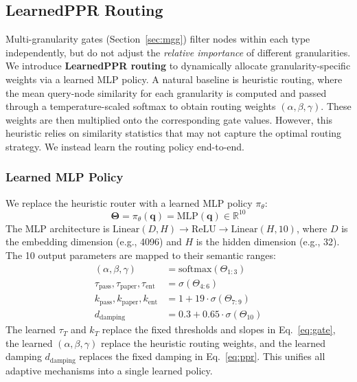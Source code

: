 \documentclass[conference,a4paper]{IEEEtran}
\newcommand{\bm}[1]{\boldsymbol{#1}}
\newcommand{\sigm}{\sigma}
\newcommand{\softmax}{\text{softmax}}
\begin{document}
\subsection{LearnedPPR Routing}\label{sec:learnedppr}

Multi-granularity gates (Section~\ref{sec:mgg}) filter nodes within each type independently, but do not adjust the \textit{relative importance} of different granularities. We introduce \textbf{LearnedPPR routing} to dynamically allocate granularity-specific weights via a learned MLP policy. A natural baseline is heuristic routing, where the mean query-node similarity for each granularity is computed and passed through a temperature-scaled softmax to obtain routing weights $(\alpha, \beta, \gamma)$. These weights are then multiplied onto the corresponding gate values. However, this heuristic relies on similarity statistics that may not capture the optimal routing strategy. We instead learn the routing policy end-to-end.

\subsubsection{Learned MLP Policy}
We replace the heuristic router with a learned MLP policy $\pi_\theta$:
\begin{equation}
    \bm{\Theta} = \pi_\theta(\bm{q}) = \text{MLP}(\bm{q}) \in \mathbb{R}^{10}
\end{equation}
The MLP architecture is $\text{Linear}(D, H) \to \text{ReLU} \to \text{Linear}(H, 10)$, where $D$ is the embedding dimension (e.g., 4096) and $H$ is the hidden dimension (e.g., 32). The 10 output parameters are mapped to their semantic ranges:
\begin{equation}
    \begin{aligned}
        (\alpha, \beta, \gamma) &= \softmax(\Theta_{1:3}) \\
        \tau_{\text{pass}}, \tau_{\text{paper}}, \tau_{\text{ent}} &= \sigm(\Theta_{4:6}) \\
        k_{\text{pass}}, k_{\text{paper}}, k_{\text{ent}} &= 1 + 19 \cdot \sigm(\Theta_{7:9}) \\
        d_{\text{damping}} &= 0.3 + 0.65 \cdot \sigm(\Theta_{10})
    \end{aligned}
    \label{eq:learnedppr_params}
\end{equation}
The learned $\tau_T$ and $k_T$ replace the fixed thresholds and slopes in Eq.~\ref{eq:gate}, the learned $(\alpha, \beta, \gamma)$ replace the heuristic routing weights, and the learned damping $d_{\text{damping}}$ replaces the fixed damping in Eq.~\ref{eq:ppr}. This unifies all adaptive mechanisms into a single learned policy.
\end{document}
